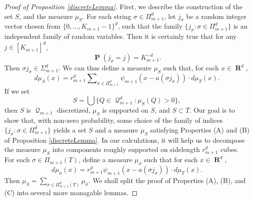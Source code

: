\documentclass[12pt,reqno]{article}
\numberwithin{equation}{section}
\DeclareMathOperator{\RR}{\mathbf{R}}
\DeclareMathOperator{\PP}{\mathbf{P}}
\DeclareMathOperator{\DQ}{\mathcal{Q}}
\begin{document}
\begin{proof}[Proof of Proposition \ref{discreteLemma}]
    \renewcommand{\qedsymbol}{}
    First, we describe the construction of the set $S$, and the measure $\mu_S$. For each string $\sigma \in \Pi_{m+1}^d$, let $j_\sigma$ be a random integer vector chosen from $\{ 0, \dots, K_{m+1} - 1 \}^d$, such that the family $\{ j_\sigma : \sigma \in \Pi_{m+1}^d \}$ is an independent family of random variables. Then it is certainly true that for any $j \in [K_{m+1}]^d$,
    \begin{equation} \label{equation129412904912090}
        \PP(j_\sigma = j) = K_{m+1}^{-d}.
    \end{equation}
    Then $\sigma j_\sigma \in \Sigma_{m+1}^d$. We can thus define a measure $\mu_S$ such that, for each $x \in \RR^d$,
    \[ d\mu_S(x) = r_{m+1}^d \sum\nolimits_{\sigma \in \Pi_{m+1}^d} \psi_{m+1}(x - a(\sigma j_\sigma)) \cdot d\mu_T(x). \]
    If we set
    \[ S = \bigcup \{ Q \in \DQ_{m+1}^d : \mu_S(Q) > 0 \}, \]
    then $S$ is $\DQ_{m+1}$ discretized, $\mu_S$ is supported on $S$, and $S \subset T$. Our goal is to show that, with non-zero probability, some choice of the family of indices $\{ j_\sigma : \sigma \in \Pi_{m+1}^d \}$ yields a set $S$ and a measure $\mu_S$ satisfying Properties (A) and (B) of Proposition \ref{discreteLemma}. In our calculations, it will help us to decompose the measure $\mu_S$ into components roughly supported on sidelength $r_{m+1}^d$ cubes. For each $\sigma \in \Pi_{m+1}(T)$, define a measure $\mu_\sigma$ such that for each $x \in \RR^d$,
    \[ d\mu_\sigma(x) = r_{m+1}^d \psi_{m+1}(x - a(\sigma j_\sigma)) \cdot d\mu_T(x). \]
    Then $\mu_S = \sum_{\sigma \in \Pi_{m+1}^d(T)} \mu_\sigma$. We shall split the proof of Properties (A), (B), and (C) into several more managable lemmas.
\end{proof}
\end{document}
